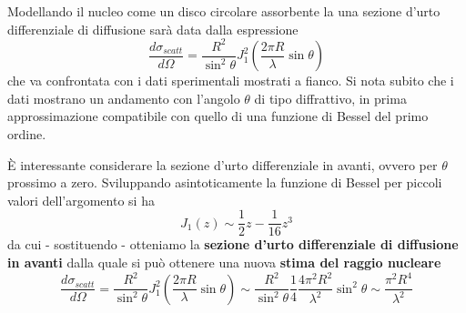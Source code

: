 Modellando il nucleo come un disco circolare assorbente la una sezione d'urto differenziale di diffusione sarà data dalla espressione \[
	\frac{d\sigma_{scatt}}{d \Omega} = \frac{R^{2}}{\sin ^{2}\theta}J_{1}^{2}\left( \frac{2 \pi R}{\lambda} \sin \theta \right)
\] che va confrontata con i dati sperimentali mostrati a fianco.
Si nota subito che i dati mostrano un andamento con l'angolo $\theta$ di tipo diffrattivo, in prima approssimazione compatibile con quello di una funzione di Bessel del primo ordine.

È interessante considerare la sezione d'urto differenziale in avanti, ovvero per $\theta$ prossimo a zero.
Sviluppando asintoticamente la funzione di Bessel per piccoli valori dell'argomento si ha \[
	J_{1}(z) \sim \frac{1}{2}z - \frac{1}{16}z^{3}
\] da cui - sostituendo - otteniamo la \textbf{sezione d'urto differenziale di diffusione in avanti} dalla quale si può ottenere una nuova \textbf{stima del raggio nucleare}
\[
	\frac{d\sigma_{scatt}}{d \Omega} = \frac{R^{2}}{\sin ^{2}\theta}J_{1}^{2}\left( \frac{2 \pi R}{\lambda} \sin \theta \right) \sim \frac{R^{2}}{\sin ^{2}\theta} \frac{1}{4} \frac{4 \pi^{2} R^{2}}{\lambda^{2}} \sin ^{2} \theta \sim \frac{\pi^{2}R^{4}}{\lambda^{2}}
\]
